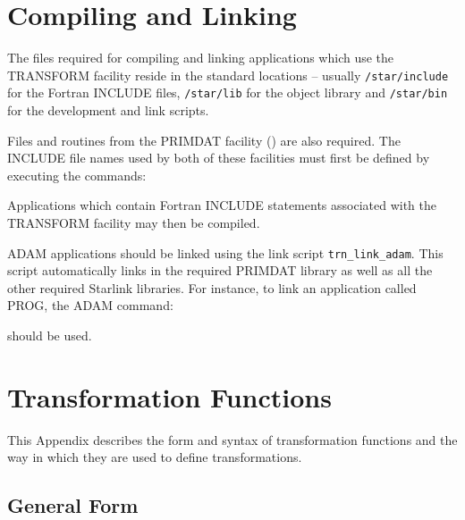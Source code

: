 \documentclass[twoside,nolof,11pt]{starlink}
\providecommand{\name}[1]{\small{#1}}
\begin{document}
\section{Compiling and Linking}

The files required for compiling and linking applications which use the
\name{TRANSFORM} facility reside in the standard locations -- usually
\texttt{/star/include} for the Fortran \name{INCLUDE} files,
\texttt{/star/lib} for the object library and \texttt{/star/bin} for the
development and link scripts.

Files and routines from the \name{PRIMDAT} facility ()
are also required.
The \name{INCLUDE} file names used by both of these facilities must first
be defined by executing the commands:

\begin{terminalv}
\end{terminalv}

Applications which contain Fortran \name{INCLUDE} statements associated with
the \name{TRANSFORM} facility may then be compiled.

ADAM applications should be linked using the link script
\texttt{trn\_link\_adam}.
This script automatically links in the required \name{PRIMDAT} library as
well as all the other required Starlink libraries.
For instance, to link an application called \name{PROG}, the \name{ADAM}
command:

\begin{terminalv}
\end{terminalv}

should be used.

\cleardoublepage
\appendix

\section{Transformation Functions}

\label{appendix_syntax}

This Appendix describes the form and syntax of transformation functions and
the way in which they are used to define transformations.


\subsection{General Form}
\end{document}
